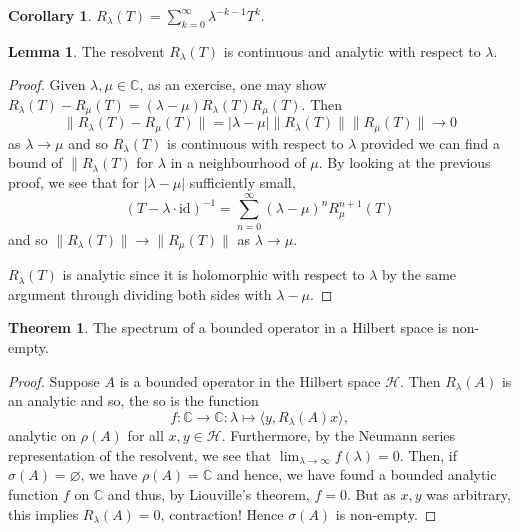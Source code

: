 \documentclass[]{article}
\theoremstyle{definition}
\newtheorem{theorem}{Theorem}
\theoremstyle{definition}
\newtheorem{lemma}{Lemma}[section]
\newtheorem{corollary}{Corollary}[section]
\begin{document}
\begin{corollary}
  \(R_\lambda(T) = \sum_{k = 0}^\infty \lambda^{- k - 1} T^k.\)
\end{corollary}

\begin{lemma}
  The resolvent \(R_\lambda(T)\) is continuous and analytic with 
  respect to \(\lambda\).
\end{lemma}
\begin{proof}
  Given \(\lambda, \mu \in \mathbb{C}\), as an exercise, one may show 
  \(R_\lambda(T) - R_\mu(T) = (\lambda - \mu)R_\lambda(T) R_\mu(T)\).
  Then 
  \[\|R_\lambda(T) - R_\mu(T)\| = |\lambda - \mu| \|R_\lambda(T)\|\|R_\mu(T)\| \to 0\]
  as \(\lambda \to \mu\) and so \(R_\lambda(T)\) is continuous with respect 
  to \(\lambda\) provided we can find a bound of \(\|R_\lambda(T)\) for \(\lambda\) 
  in a neighbourhood of \(\mu\). By looking at the previous proof, we see that 
  for \(|\lambda - \mu|\) sufficiently small,
  \[(T - \lambda \cdot \text{id})^{-1} = 
  \sum_{n = 0}^\infty (\lambda - \mu)^nR_{\mu}^{n + 1}(T)\] 
  and so \(\|R_\lambda(T)\| \to \|R_\mu(T)\|\) as \(\lambda \to \mu\).

  \(R_\lambda(T)\) is analytic since it is holomorphic with respect to 
  \(\lambda\) by the same argument through dividing both sides with 
  \(\lambda - \mu\).
\end{proof}

\begin{theorem}
  The spectrum of a bounded operator in a Hilbert space is non-empty.
\end{theorem}
\begin{proof}
  Suppose \(A\) is a bounded operator in the Hilbert space \(\mathcal{H}\). 
  Then \(R_\lambda(A)\) is an analytic and so, the so is the function 
  \[f : \mathbb{C} \to \mathbb{C} : \lambda \mapsto \langle y, R_\lambda(A)x\rangle,\]
  analytic on \(\rho(A)\) for all \(x, y \in \mathcal{H}\). Furthermore, by 
  the Neumann series representation of the resolvent, we see that 
  \(\lim_{\lambda \to \infty} f(\lambda) = 0\). Then, if 
  \(\sigma(A) = \varnothing\), 
  we have \(\rho(A) = \mathbb{C}\) and hence, we have found a bounded analytic 
  function \(f\) on \(\mathbb{C}\) and thus, by Liouville's theorem, 
  \(f = 0\). But as \(x, y\) was arbitrary, this implies \(R_\lambda(A) = 0\), 
  contraction! Hence \(\sigma(A)\) is non-empty.
\end{proof}
\end{document}
